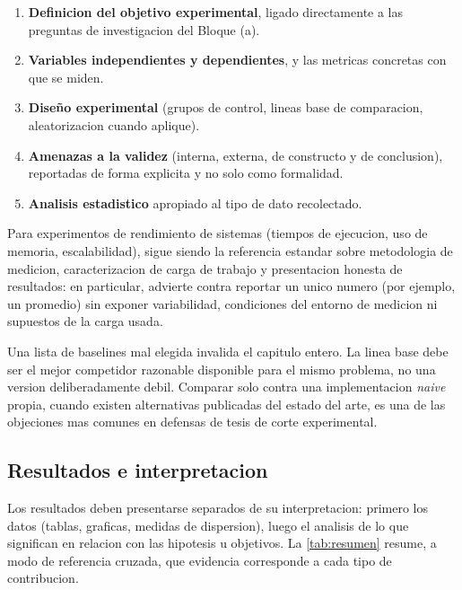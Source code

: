 \documentclass[11pt]{article}
\begin{document}
\begin{enumerate}
  \item \textbf{Definicion del objetivo experimental}, ligado directamente a
  las preguntas de investigacion del Bloque (a).
  \item \textbf{Variables independientes y dependientes}, y las metricas
  concretas con que se miden.
  \item \textbf{Diseño experimental} (grupos de control, lineas base de
  comparacion, aleatorizacion cuando aplique).
  \item \textbf{Amenazas a la validez} (interna, externa, de constructo y de
  conclusion), reportadas de forma explicita y no solo como formalidad.
  \item \textbf{Analisis estadistico} apropiado al tipo de dato recolectado.
\end{enumerate}

Para experimentos de rendimiento de sistemas (tiempos de ejecucion, uso de
memoria, escalabilidad), \citet{jain1991art} sigue siendo la referencia
estandar sobre metodologia de medicion, caracterizacion de carga de trabajo y
presentacion honesta de resultados: en particular, advierte contra reportar
un unico numero (por ejemplo, un promedio) sin exponer variabilidad,
condiciones del entorno de medicion ni supuestos de la carga usada.

\begin{cajaAlerta}
Una lista de baselines mal elegida invalida el capitulo entero. La linea
base debe ser el mejor competidor razonable disponible para el mismo
problema, no una version deliberadamente debil. Comparar solo contra una
implementacion \emph{naive} propia, cuando existen alternativas publicadas
del estado del arte, es una de las objeciones mas comunes en defensas de
tesis de corte experimental.
\end{cajaAlerta}

\subsection{Resultados e interpretacion}

Los resultados deben presentarse separados de su interpretacion: primero los
datos (tablas, graficas, medidas de dispersion), luego el analisis de lo que
significan en relacion con las hipotesis u objetivos. La \cref{tab:resumen}
resume, a modo de referencia cruzada, que evidencia corresponde a cada tipo
de contribucion.
\end{document}
